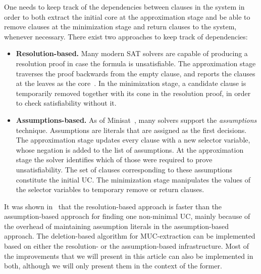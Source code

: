 \documentclass[twoside,11pt]{article}
\begin{document}
One needs to keep track of the dependencies between clauses in the system in order to both extract the initial core at the approximation stage and be able to remove clauses at the minimization stage and return clauses to the system, whenever necessary. There exist two approaches to keep track of dependencies:
\begin{itemize}
\item {\bf Resolution-based.} Many modern SAT solvers are capable of producing a resolution proof in case the
    formula is unsatisfiable. The approximation stage traverses the proof backwards from the empty clause, and reports the clauses at the leaves as the core~\cite{ZM03,GN03}. In the minimization stage, a candidate clause is temporarily removed together with its cone in the resolution proof, in order to check satisfiability without it.

\item {\bf Assumptions-based.} As of Minisat~\cite{ES03}, many solvers support the
    \emph{assumptions} technique. Assumptions are literals that are assigned \true as the first
    decisions. The approximation stage updates every clause with a new selector variable, whose negation is added to the list of assumptions. At the approximation stage the solver identifies which of those were required to prove unsatisfiability. The set of clauses corresponding to these assumptions constitute the initial UC. The minimization stage manipulates the values of the selector variables to temporary remove or return clauses.
\end{itemize}
%
It was shown in~\cite{DBLP:conf/lpar/AsinNOR08} that the resolution-based approach is faster than the assumption-based approach for finding one non-minimal UC, mainly because of the overhead of maintaining assumption literals in the assumption-based approach. The deletion-based algorithm for MUC-extraction can be implemented based on either the resolution- or the assumption-based infrastructure. Most of the improvements that we will present in this article can also be implemented in both, although we will only present them in the context of the former.
\end{document}

